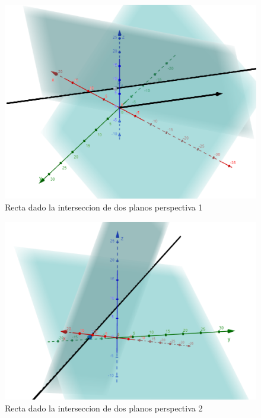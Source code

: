 \documentclass{templateNote}
\begin{document}
\begin{figure}[H]
    \centering
    \includegraphics[width=0.6\linewidth]{img/RectaInterseccionP1.png}
    \caption{Recta dado la interseccion de dos planos perspectiva 1}
\end{figure}
\begin{figure}[H]
    \centering
    \includegraphics[width=0.6\linewidth]{img/RectaInterseccionP2.png}
    \caption{Recta dado la interseccion de dos planos perspectiva 2}
\end{figure}
\end{document}
